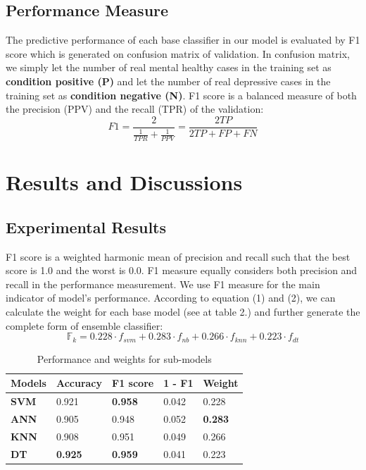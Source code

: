\documentclass[10pt,journal,compsoc]{IEEEtran}
\begin{document}
\subsection{Performance Measure}
The predictive performance of each base classifier in our model is evaluated by F1 score which is generated on confusion matrix of validation. In confusion matrix, we simply let the number of real mental healthy cases in the training set as \textbf{condition positive (P)} and let the number of real depressive cases in the training set as  \textbf{condition negative (N)}. F1 score is a balanced measure of both the precision (PPV) and the recall (TPR) of the validation: 
\begin{equation}\label{reio}
	F1 = \frac{2 }{\frac{1}{TPR} + \frac{1}{PPV}} = \frac{2TP}{2TP + FP + FN}
\end{equation}
%
%
%
%
%
%
%
\section{Results and Discussions}
\subsection{Experimental Results}
F1 score is a weighted harmonic mean of precision and recall such that the best score is 1.0 and the worst is 0.0. F1 measure equally considers both precision and recall in the performance measurement. We use F1 measure for the main indicator of model's performance. According to equation (1) and (2), we can calculate the weight for each base model (see at table 2.) and further generate the complete form of ensemble classifier:
\begin{equation}
\mathbb{F}_{k} = 0.228 \cdot f_{svm} + 0.283 \cdot f_{nb} + 0.266 \cdot f_{knn} + 0.223 \cdot f_{dt}
\end{equation}

\begin{table}[ht]
\centering
\begin{tabular}{|C{1cm}|C{1.2cm}|C{1.2cm}|C{0.8cm}|C{1cm}|}
\hline
{} 
{\color[HTML]{000000} \textbf{Models}} & {\color[HTML]{000000} \textbf{Accuracy}} & {\color[HTML]{000000} \textbf{F1 score}} & {\color[HTML]{000000} \textbf{1 - F1}} & {\color[HTML]{000000} \textbf{Weight}} \\ \hline
{} 
\textbf{SVM}& 0.921 & \textbf{0.958}  & 0.042  & 0.228 \\ \hline
{} 
\textbf{ANN} & 0.905 & 0.948  & 0.052   & \textbf{0.283}    \\ \hline
{} 
\textbf{KNN} & 0.908 & 0.951   & 0.049  & 0.266 \\ \hline
{} 
\textbf{DT}  & \textbf{0.925} & \textbf{0.959}  & 0.041  & 0.223  \\ \hline
\end{tabular}
\caption{Performance and weights for sub-models}
\label{weight}
\end{table}
\end{document}
